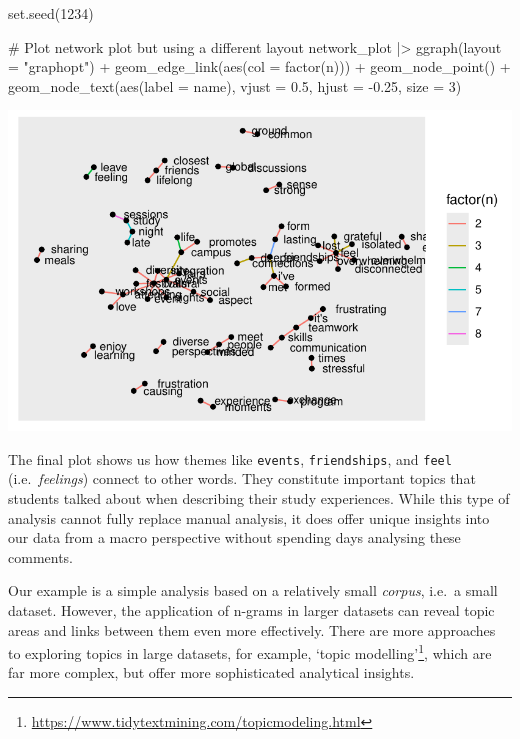 \documentclass[
  letterpaper,
]{krantz}
\makeatletter
\newenvironment{Shaded}{\begin{snugshade}}{\end{snugshade}}
\newcommand{\AttributeTok}[1]{\textcolor[rgb]{0.40,0.45,0.13}{#1}}
\newcommand{\CommentTok}[1]{\textcolor[rgb]{0.37,0.37,0.37}{#1}}
\newcommand{\DecValTok}[1]{\textcolor[rgb]{0.68,0.00,0.00}{#1}}
\newcommand{\FloatTok}[1]{\textcolor[rgb]{0.68,0.00,0.00}{#1}}
\newcommand{\FunctionTok}[1]{\textcolor[rgb]{0.28,0.35,0.67}{#1}}
\newcommand{\NormalTok}[1]{\textcolor[rgb]{0.00,0.23,0.31}{#1}}
\newcommand{\SpecialCharTok}[1]{\textcolor[rgb]{0.37,0.37,0.37}{#1}}
\newcommand{\StringTok}[1]{\textcolor[rgb]{0.13,0.47,0.30}{#1}}
\renewcommand{\href}[2]{#2\footnote{\url{#1}}}
\newenvironment{kframe}{%
\medskip{}
\setlength{\fboxsep}{.8em}
 \def\at@end@of@kframe{}%
 \ifinner\ifhmode%
  \def\at@end@of@kframe{\end{minipage}}%
  \begin{minipage}{\columnwidth}%
 \fi\fi%
 \def\FrameCommand##1{\hskip\@totalleftmargin \hskip-\fboxsep
 \colorbox{shadecolor}{##1}\hskip-\fboxsep
     \hskip-\linewidth \hskip-\@totalleftmargin \hskip\columnwidth}%
 \MakeFramed {\advance\hsize-\width
   \@totalleftmargin\z@ \linewidth\hsize
   \@setminipage}}%
 {\par\unskip\endMakeFramed%
 \at@end@of@kframe}
\renewenvironment{Shaded}{\begin{kframe}}{\end{kframe}}
\makeatother
\begin{document}
\begin{Shaded}
\begin{Highlighting}[]
\FunctionTok{set.seed}\NormalTok{(}\DecValTok{1234}\NormalTok{)}

\CommentTok{\# Plot network plot but using a different layout}
\NormalTok{network\_plot }\SpecialCharTok{|\textgreater{}}
  \FunctionTok{ggraph}\NormalTok{(}\AttributeTok{layout =} \StringTok{"graphopt"}\NormalTok{) }\SpecialCharTok{+}
  \FunctionTok{geom\_edge\_link}\NormalTok{(}\FunctionTok{aes}\NormalTok{(}\AttributeTok{col =} \FunctionTok{factor}\NormalTok{(n))) }\SpecialCharTok{+}
  \FunctionTok{geom\_node\_point}\NormalTok{() }\SpecialCharTok{+}
  \FunctionTok{geom\_node\_text}\NormalTok{(}\FunctionTok{aes}\NormalTok{(}\AttributeTok{label =}\NormalTok{ name),}
                 \AttributeTok{vjust =} \FloatTok{0.5}\NormalTok{,}
                 \AttributeTok{hjust =} \SpecialCharTok{{-}}\FloatTok{0.25}\NormalTok{,}
                 \AttributeTok{size =} \DecValTok{3}\NormalTok{)}
\end{Highlighting}
\end{Shaded}

\includegraphics{14_mixed_methods_files/figure-pdf/ngrams-network-plot-step-four-1.pdf}

The final plot shows us how themes like \texttt{events},
\texttt{friendships}, and \texttt{feel} (i.e.~\emph{feelings}) connect
to other words. They constitute important topics that students talked
about when describing their study experiences. While this type of
analysis cannot fully replace manual analysis, it does offer unique
insights into our data from a macro perspective without spending days
analysing these comments.

Our example is a simple analysis based on a relatively small
\emph{corpus}, i.e.~a small dataset. However, the application of n-grams
in larger datasets can reveal topic areas and links between them even
more effectively. There are more approaches to exploring topics in large
datasets, for example,
\href{https://www.tidytextmining.com/topicmodeling.html}{`topic
modelling'}, which are far more complex, but offer more sophisticated
analytical insights.
\end{document}
